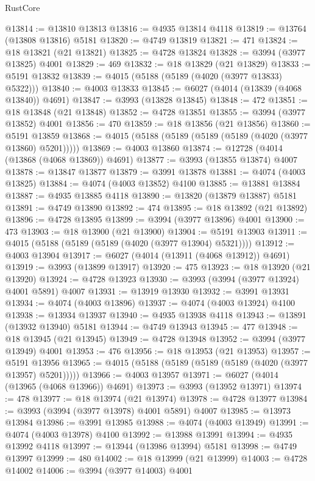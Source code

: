 \begin{lexlean}{RustCore}
\begin{coremodule}
@13814 := @13810 @13813
@13816 := @4935 @13814 @4118
@13819 := @13764 (@13808 @13816) @5181
@13820 := @4749 @13819
@13821 := 471
@13824 := @18 @13821 (@21 @13821)
@13825 := @4728 @13824
@13828 := @3994 (@3977 @13825) @4001
@13829 := 469
@13832 := @18 @13829 (@21 @13829)
@13833 := @5191 @13832
@13839 := @4015 (@5188 (@5189 (@4020 (@3977 @13833) @5322)))
@13840 := @4003 @13833
@13845 := @6027 (@4014 (@13839 (@4068 @13840)) @4691)
@13847 := @3993 (@13828 @13845)
@13848 := 472
@13851 := @18 @13848 (@21 @13848)
@13852 := @4728 @13851
@13855 := @3994 (@3977 @13852) @4001
@13856 := 470
@13859 := @18 @13856 (@21 @13856)
@13860 := @5191 @13859
@13868 := @4015 (@5188 (@5189 (@5189 (@5189 (@4020 (@3977 @13860) @5201)))))
@13869 := @4003 @13860
@13874 := @12728 (@4014 (@13868 (@4068 @13869)) @4691)
@13877 := @3993 (@13855 @13874) @4007
@13878 := @13847 @13877
@13879 := @3991 @13878
@13881 := @4074 (@4003 @13825)
@13884 := @4074 (@4003 @13852) @4100
@13885 := @13881 @13884
@13887 := @4935 @13885 @4118
@13890 := @13820 (@13879 @13887) @5181
@13891 := @4749 @13890
@13892 := 474
@13895 := @18 @13892 (@21 @13892)
@13896 := @4728 @13895
@13899 := @3994 (@3977 @13896) @4001
@13900 := 473
@13903 := @18 @13900 (@21 @13900)
@13904 := @5191 @13903
@13911 := @4015 (@5188 (@5189 (@5189 (@4020 (@3977 @13904) @5321))))
@13912 := @4003 @13904
@13917 := @6027 (@4014 (@13911 (@4068 @13912)) @4691)
@13919 := @3993 (@13899 @13917)
@13920 := 475
@13923 := @18 @13920 (@21 @13920)
@13924 := @4728 @13923
@13930 := @3993 (@3994 (@3977 @13924) @4001 @5891) @4007
@13931 := @13919 @13930
@13932 := @3991 @13931
@13934 := @4074 (@4003 @13896)
@13937 := @4074 (@4003 @13924) @4100
@13938 := @13934 @13937
@13940 := @4935 @13938 @4118
@13943 := @13891 (@13932 @13940) @5181
@13944 := @4749 @13943
@13945 := 477
@13948 := @18 @13945 (@21 @13945)
@13949 := @4728 @13948
@13952 := @3994 (@3977 @13949) @4001
@13953 := 476
@13956 := @18 @13953 (@21 @13953)
@13957 := @5191 @13956
@13965 := @4015 (@5188 (@5189 (@5189 (@5189 (@4020 (@3977 @13957) @5201)))))
@13966 := @4003 @13957
@13971 := @6027 (@4014 (@13965 (@4068 @13966)) @4691)
@13973 := @3993 (@13952 @13971)
@13974 := 478
@13977 := @18 @13974 (@21 @13974)
@13978 := @4728 @13977
@13984 := @3993 (@3994 (@3977 @13978) @4001 @5891) @4007
@13985 := @13973 @13984
@13986 := @3991 @13985
@13988 := @4074 (@4003 @13949)
@13991 := @4074 (@4003 @13978) @4100
@13992 := @13988 @13991
@13994 := @4935 @13992 @4118
@13997 := @13944 (@13986 @13994) @5181
@13998 := @4749 @13997
@13999 := 480
@14002 := @18 @13999 (@21 @13999)
@14003 := @4728 @14002
@14006 := @3994 (@3977 @14003) @4001

\end{coremodule}
\end{lexlean}
